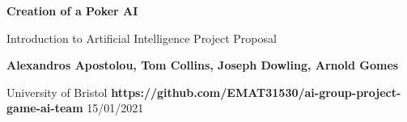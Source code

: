 \documentclass{article}
\begin{document}
\begin{titlepage}
    \begin{center}
        \vspace*{1cm}

        \Huge
        \textbf{Creation of a Poker AI}

        \vspace{0.5cm}
        \LARGE
        Introduction to Artificial Intelligence Project Proposal

        \vspace{1.5cm}

        \textbf{Alexandros Apostolou, Tom Collins, Joseph Dowling, Arnold Gomes}

        \vfill


        \vspace{0.8cm}
        \Large
        University of Bristol
        \textbf{https://github.com/EMAT31530/ai-group-project-game-ai-team}
        15/01/2021

    \end{center}
\end{titlepage}
\end{document}
